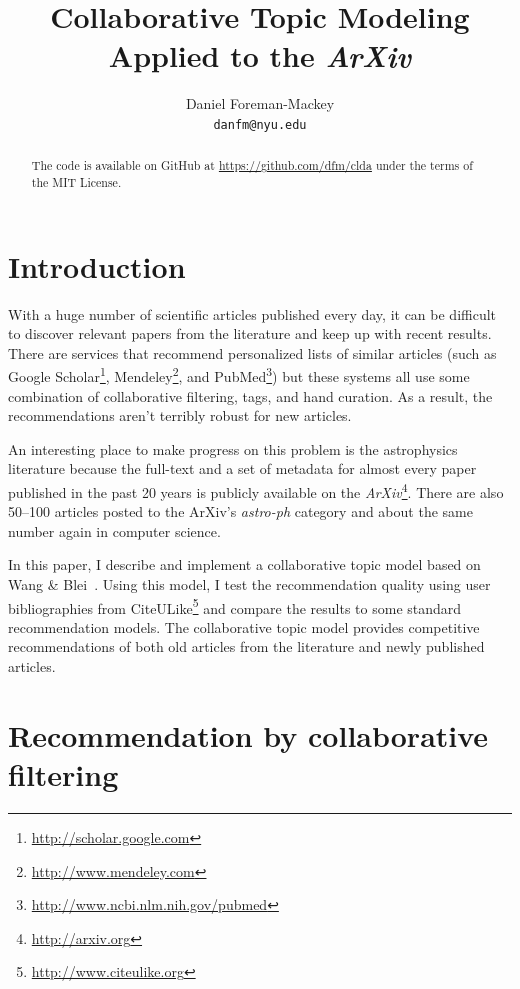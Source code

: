 \documentclass[11pt]{article}
\title{Collaborative Topic Modeling Applied to the \emph{ArXiv}}
\author{Daniel Foreman-Mackey \\ {\tt danfm@nyu.edu} \\}
\begin{document}
\maketitle

\begin{abstract}
The code is available on GitHub at \url{https://github.com/dfm/clda} under
the terms of the MIT License.
\end{abstract}

\section{Introduction}

With a huge number of scientific articles published every day, it can be
difficult to discover relevant papers from the literature and keep up with
recent results.
There are services that recommend personalized lists of similar articles
(such as Google Scholar\footnote{\url{http://scholar.google.com}},
Mendeley\footnote{\url{http://www.mendeley.com}}, and
PubMed\footnote{\url{http://www.ncbi.nlm.nih.gov/pubmed}}) but these systems
all use some combination of collaborative filtering, tags, and hand curation.
As a result, the recommendations aren't terribly robust for new articles.

An interesting place to make progress on this problem is the astrophysics
literature because the full-text and a set of metadata for almost every paper
published in the past 20 years is publicly available on the
\emph{ArXiv}\footnote{\url{http://arxiv.org}}.
There are also 50--100 articles posted to the ArXiv's \emph{astro-ph} category
and about the same number again in computer science.

In this paper, I describe and implement a collaborative topic model based on
Wang \& Blei~.
Using this model, I test the recommendation quality using user bibliographies
from CiteULike\footnote{\url{http://www.citeulike.org}} and compare the
results to some standard recommendation models.
The collaborative topic model provides competitive recommendations of both old
articles from the literature and newly published articles.

\section{Recommendation by collaborative filtering}
\end{document}
